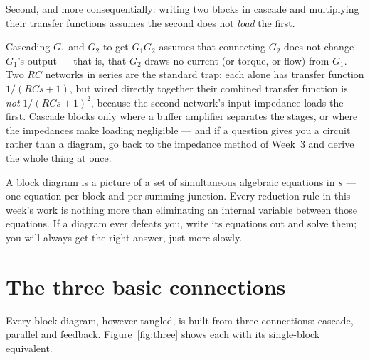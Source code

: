\documentclass[11pt,a4paper]{article}
\begin{document}
Second, and more consequentially: writing two blocks in cascade and multiplying
their transfer functions assumes the second does not \emph{load} the first.

\begin{pitfall}
Cascading $G_1$ and $G_2$ to get $G_1G_2$ assumes that connecting $G_2$ does
not change $G_1$'s output --- that is, that $G_2$ draws no current (or torque,
or flow) from $G_1$. Two $RC$ networks in series are the standard trap: each
alone has transfer function $1/(RCs+1)$, but wired directly together their
combined transfer function is \emph{not} $1/(RCs+1)^2$, because the second
network's input impedance loads the first. Cascade blocks only where a buffer
amplifier separates the stages, or where the impedances make loading
negligible --- and if a question gives you a circuit rather than a diagram, go
back to the impedance method of Week~3 and derive the whole thing at once.
\end{pitfall}

\begin{keyidea}
A block diagram is a picture of a set of simultaneous algebraic equations in
$s$ --- one equation per block and per summing junction. Every reduction rule
in this week's work is nothing more than eliminating an internal variable
between those equations. If a diagram ever defeats you, write its equations out
and solve them; you will always get the right answer, just more slowly.
\end{keyidea}

\section{The three basic connections}
\label{sec:connections}

Every block diagram, however tangled, is built from three connections:
cascade, parallel and feedback. Figure~\ref{fig:three} shows each with its
single-block equivalent.
\end{document}
